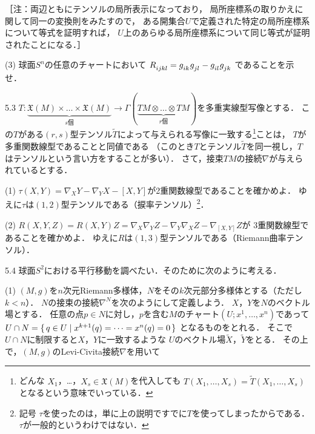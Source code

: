 \documentclass[uplatex,dvipdfmx,fontsize=12pt,jafontsize=11pt,line_length=42zw,number_of_lines=36,hanging_punctuation]{jlreq}
\begin{document}
\begin{problems}
\begin{subproblems}
				［注：両辺ともにテンソルの局所表示になっており，
				局所座標系の取りかえに関して同一の変換則をみたすので，
				ある開集合$U$で定義された特定の局所座標系について等式を証明すれば，
				$U$上のあらゆる局所座標系について同じ等式が証明されたことになる．］
			\item[(3)]
				球面$S^n$の任意のチャートにおいて
				$\tensor{R}{_i_j_k_l}=\tensor{g}{_i_k}\tensor{g}{_j_l}-\tensor{g}{_i_l}\tensor{g}{_j_k}$
				であることを示せ．
		\end{subproblems}
	\item[5.3]
		$T\colon\underbrace{\mathfrak{X}(M)\times\dots\times\mathfrak{X}(M)}_{\text{$s$個}}
		\to\Gamma(\underbrace{TM\otimes\dots\otimes TM}_{\text{$r$個}})$を多重実線型写像とする．
		この$T$がある$(r,s)$型テンソル$\tilde{T}$によって与えられる写像に一致する\footnote{どんな
		$X_1$，…，$X_s\in\mathfrak{X}(M)$を代入しても
		$T(X_1,\dots,X_s)=\tilde{T}(X_1,\dots,X_s)$となるという意味でいっている．}ことは，
		$T$が多重関数線型であることと同値である
		（このとき$T$とテンソル$\tilde{T}$を同一視し，$T$はテンソルという言い方をすることが多い）．
		さて，接束$TM$の接続$\nabla$が与えられているとする．
		\begin{subproblems}
			\item[(1)]
				$\tau(X,Y)=\nabla_XY-\nabla_YX-[X,Y]$が2重関数線型であることを確かめよ．
				ゆえに$\tau$は$(1,2)$型テンソルである（捩率テンソル）\footnote{記号
				$\tau$を使ったのは，単に上の説明ですでに$T$を使ってしまったからである．
				$\tau$が一般的というわけではない．}．
			\item[(2)]
				$R(X,Y,Z)=R(X,Y)Z=\nabla_X\nabla_YZ-\nabla_Y\nabla_XZ-\nabla_{[X,Y]}Z$が
				3重関数線型であることを確かめよ．
				ゆえに$R$は$(1,3)$型テンソルである（Riemann曲率テンソル）．
		\end{subproblems}
	\item[5.4]
		球面$S^2$における平行移動を調べたい．そのために次のように考える．
		\begin{subproblems}
			\item[(1)]
				$(M,g)$を$n$次元Riemann多様体，$N$をその$k$次元部分多様体とする（ただし$k<n$）．
				$N$の接束の接続$\nabla^N$を次のようにして定義しよう．
				$X$，$Y$を$N$のベクトル場とする．
				任意の点$p\in N$に対し，$p$を含む$M$のチャート$(U;x^1,\dots,x^n)$であって
				$U\cap N=\set{q\in U|x^{k+1}(q)=\dots=x^n(q)=0}$
				となるものをとれる．
				そこで$U\cap N$に制限すると$X$，$Y$に一致するような
				$U$のベクトル場$\tilde{X}$，$\tilde{Y}$をとる．
				その上で，$(M,g)$のLevi-Civita接続$\nabla$を用いて
				\begin{equation}

\end{equation}
\end{subproblems}
\end{problems}
\end{document}
